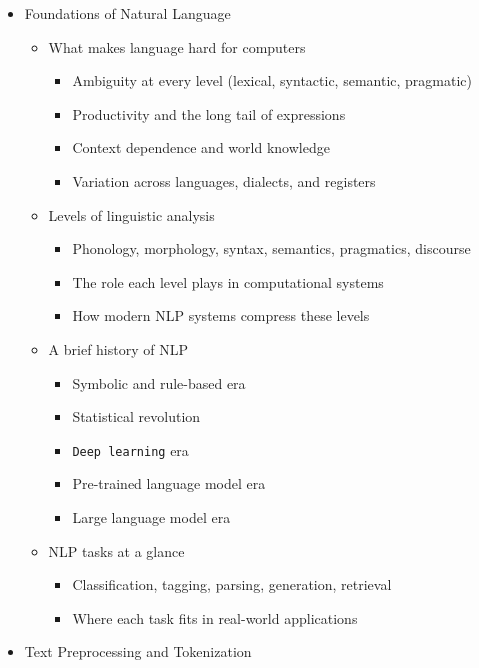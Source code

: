 \documentclass[
]{article}
\providecommand{\tightlist}{%
  \setlength{\itemsep}{0pt}\setlength{\parskip}{0pt}}
\begin{document}
\begin{itemize}
\tightlist
\item
  Foundations of Natural Language

  \begin{itemize}
  \tightlist
  \item
    What makes language hard for computers

    \begin{itemize}
    \tightlist
    \item
      Ambiguity at every level (lexical, syntactic, semantic, pragmatic)
    \item
      Productivity and the long tail of expressions
    \item
      Context dependence and world knowledge
    \item
      Variation across languages, dialects, and registers
    \end{itemize}
  \item
    Levels of linguistic analysis

    \begin{itemize}
    \tightlist
    \item
      Phonology, morphology, syntax, semantics, pragmatics, discourse
    \item
      The role each level plays in computational systems
    \item
      How modern NLP systems compress these levels
    \end{itemize}
  \item
    A brief history of NLP

    \begin{itemize}
    \tightlist
    \item
      Symbolic and rule-based era
    \item
      Statistical revolution
    \item
      \texttt{Deep\ learning} era
    \item
      Pre-trained language model era
    \item
      Large language model era
    \end{itemize}
  \item
    NLP tasks at a glance

    \begin{itemize}
    \tightlist
    \item
      Classification, tagging, parsing, generation, retrieval
    \item
      Where each task fits in real-world applications
    \end{itemize}
  \end{itemize}
\item
  Text Preprocessing and Tokenization


\end{itemize}
\end{document}
